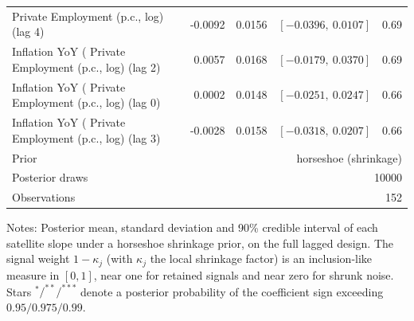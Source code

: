 \begin{table}[!htbp]
\begin{tabular}{lrrrr}
Private Employment (p.c., log) (lag 4) & -0.0092 & 0.0156 & $[-0.0396,\ 0.0107]$ & 0.69 \\
Inflation YoY (%
Private Employment (p.c., log) (lag 2) & 0.0057 & 0.0168 & $[-0.0179,\ 0.0370]$ & 0.69 \\
Inflation YoY (%
Private Employment (p.c., log) (lag 0) & 0.0002 & 0.0148 & $[-0.0251,\ 0.0247]$ & 0.66 \\
Inflation YoY (%
Private Employment (p.c., log) (lag 3) & -0.0028 & 0.0158 & $[-0.0318,\ 0.0207]$ & 0.66 \\
\midrule
Prior & \multicolumn{4}{r}{horseshoe (shrinkage)} \\
Posterior draws & \multicolumn{4}{r}{10000} \\
Observations & \multicolumn{4}{r}{152} \\
\bottomrule
\end{tabular}
\begin{tablenotes}\small
\item Notes: Posterior mean, standard deviation and 90\% credible interval of each satellite slope under a horseshoe shrinkage prior, on the full lagged design. The signal weight $1-\kappa_j$ (with $\kappa_j$ the local shrinkage factor) is an inclusion-like measure in $[0,1]$, near one for retained signals and near zero for shrunk noise. Stars $^{*}/^{**}/^{***}$ denote a posterior probability of the coefficient sign exceeding $0.95/0.975/0.99$.
\end{tablenotes}
\end{table}

